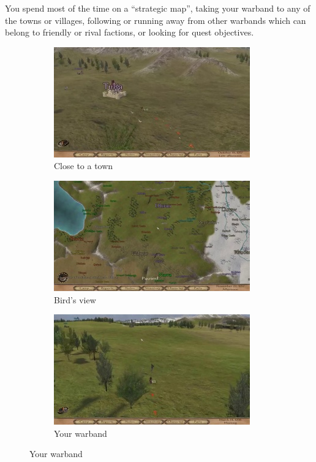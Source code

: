 \documentclass[
]{article}
\begin{document}
You spend most of the time on a ``strategic map'', taking your warband to
any of the towns or villages, following or running away from other
warbands which can belong to friendly or rival factions, or looking for
quest objectives.


\begin{figure}[H]
	\centering
	\begin{subfigure}[b]{0.3\textwidth}
		\includegraphics[width=\linewidth]{docimages/E_0041_00_09_28.jpg}
		\caption{Close to a town}
	\end{subfigure}
	\begin{subfigure}[b]{0.3\textwidth}
		\includegraphics[width=\linewidth]{docimages/E_0049_00_15_38.jpg}
		\caption{Bird's view}
	\end{subfigure}
	\begin{subfigure}[b]{0.3\textwidth}
		\includegraphics[width=\linewidth]{docimages/E_0063_00_17_06.jpg}
		\caption{Your warband}
	\end{subfigure}
\end{figure}
\end{document}
